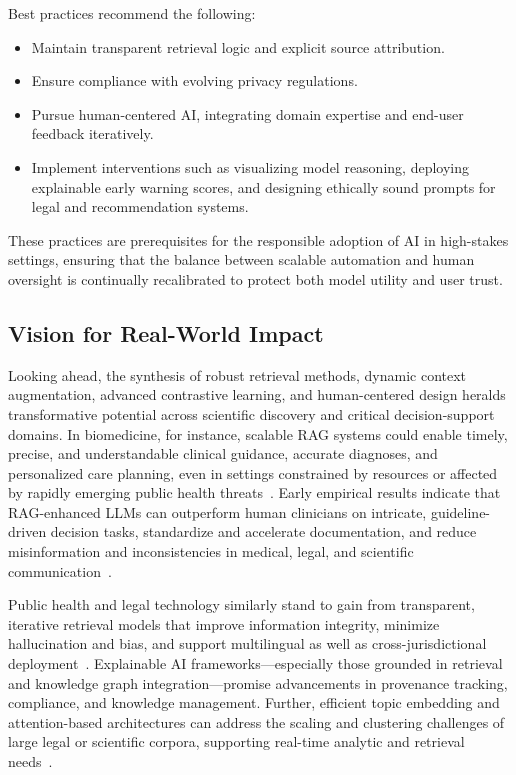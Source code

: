 Best practices recommend the following:
\begin{itemize}
    \item Maintain transparent retrieval logic and explicit source attribution.
    \item Ensure compliance with evolving privacy regulations.
    \item Pursue human-centered AI, integrating domain expertise and end-user feedback iteratively.
    \item Implement interventions such as visualizing model reasoning, deploying explainable early warning scores, and designing ethically sound prompts for legal and recommendation systems.
\end{itemize}
These practices are prerequisites for the responsible adoption of AI in high-stakes settings, ensuring that the balance between scalable automation and human oversight is continually recalibrated to protect both model utility and user trust.

\subsection{Vision for Real-World Impact}

Looking ahead, the synthesis of robust retrieval methods, dynamic context augmentation, advanced contrastive learning, and human-centered design heralds transformative potential across scientific discovery and critical decision-support domains. In biomedicine, for instance, scalable RAG systems could enable timely, precise, and understandable clinical guidance, accurate diagnoses, and personalized care planning, even in settings constrained by resources or affected by rapidly emerging public health threats~\cite{ref1, ref2, ref5, ref9, ref11}. Early empirical results indicate that RAG-enhanced LLMs can outperform human clinicians on intricate, guideline-driven decision tasks, standardize and accelerate documentation, and reduce misinformation and inconsistencies in medical, legal, and scientific communication~\cite{ref6, ref8, ref22, ref36, ref40}.

Public health and legal technology similarly stand to gain from transparent, iterative retrieval models that improve information integrity, minimize hallucination and bias, and support multilingual as well as cross-jurisdictional deployment~\cite{ref10, ref20, ref36, ref38}. Explainable AI frameworks—especially those grounded in retrieval and knowledge graph integration—promise advancements in provenance tracking, compliance, and knowledge management. Further, efficient topic embedding and attention-based architectures can address the scaling and clustering challenges of large legal or scientific corpora, supporting real-time analytic and retrieval needs~\cite{ref13, ref19, ref21}.

